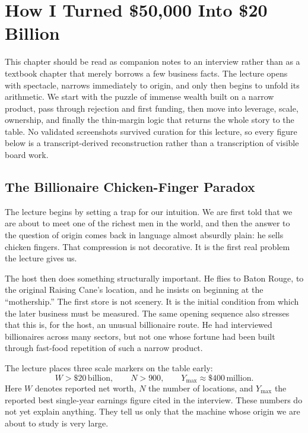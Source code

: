\chapter{How I Turned \$50{,}000 Into \$20 Billion}

This chapter should be read as companion notes to an interview rather than as a textbook chapter that merely borrows a few business facts. The lecture opens with spectacle, narrows immediately to origin, and only then begins to unfold its arithmetic. We start with the puzzle of immense wealth built on a narrow product, pass through rejection and first funding, then move into leverage, scale, ownership, and finally the thin-margin logic that returns the whole story to the table. No validated screenshots survived curation for this lecture, so every figure below is a transcript-derived reconstruction rather than a transcription of visible board work.

\section{The Billionaire Chicken-Finger Paradox}

The lecture begins by setting a trap for our intuition. We are first told that we are about to meet one of the richest men in the world, and then the answer to the question of origin comes back in language almost absurdly plain: he sells chicken fingers. That compression is not decorative. It is the first real problem the lecture gives us.

The host then does something structurally important. He flies to Baton Rouge, to the original Raising Cane's location, and he insists on beginning at the ``mothership.'' The first store is not scenery. It is the initial condition from which the later business must be measured. The same opening sequence also stresses that this is, for the host, an unusual billionaire route. He had interviewed billionaires across many sectors, but not one whose fortune had been built through fast-food repetition of such a narrow product.

The lecture places three scale markers on the table early:
\begin{equation}
W > \$20\,\text{billion},\qquad N>900,\qquad Y_{\max}\approx \$400\,\text{million}.
\end{equation}
Here \(W\) denotes reported net worth, \(N\) the number of locations, and \(Y_{\max}\) the reported best single-year earnings figure cited in the interview. These numbers do not yet explain anything. They tell us only that the machine whose origin we are about to study is very large.

